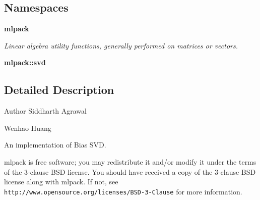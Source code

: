 \subsection*{Namespaces}
\begin{DoxyCompactItemize}
\item 
 \textbf{ mlpack}
\begin{DoxyCompactList}\small\item\em Linear algebra utility functions, generally performed on matrices or vectors. \end{DoxyCompactList}\item 
 \textbf{ mlpack\+::svd}
\end{DoxyCompactItemize}


\subsection{Detailed Description}
\begin{DoxyAuthor}{Author}
Siddharth Agrawal 

Wenhao Huang
\end{DoxyAuthor}
An implementation of Bias S\+VD.

mlpack is free software; you may redistribute it and/or modify it under the terms of the 3-\/clause B\+SD license. You should have received a copy of the 3-\/clause B\+SD license along with mlpack. If not, see {\tt http\+://www.\+opensource.\+org/licenses/\+B\+S\+D-\/3-\/\+Clause} for more information. 